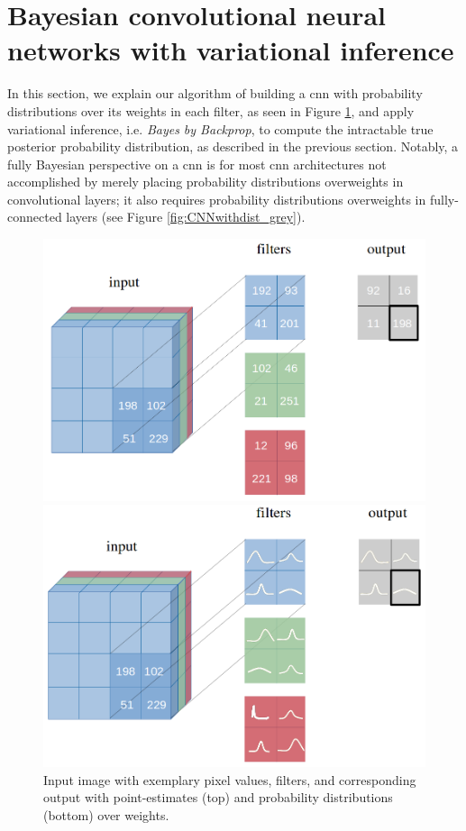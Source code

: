 \section{Bayesian convolutional neural networks with variational inference}
In this section, we explain our algorithm of building a \ac{cnn} with probability distributions over its weights in each filter, as seen in Figure \ref{fig:filter_scalar}, and apply variational inference, i.e. \textit{Bayes by Backprop}, to compute the intractable true posterior probability distribution, as described in the previous section. Notably, a fully Bayesian perspective on a \ac{cnn} is for most \ac{cnn} architectures not accomplished by merely placing probability distributions overweights in convolutional layers; it also requires probability distributions overweights in fully-connected layers (see Figure \ref{fig:CNNwithdist_grey}). 
%
\begin{figure}[H] 
\centering
\begin{minipage}{.4\textwidth}
\centering
\includegraphics[width=\linewidth]{Chapter4/Figs/filter_scalars.png}
\end{minipage}
%
\begin{minipage}{.4\textwidth}
\centering
\includegraphics[width=\linewidth]{Chapter4/Figs/CNNwithdist.png}
\end{minipage}
\caption{Input image with exemplary pixel values, filters, and corresponding output with point-estimates (top) and probability distributions (bottom) over weights.}
\label{fig:filter_scalar}
\end{figure} 
